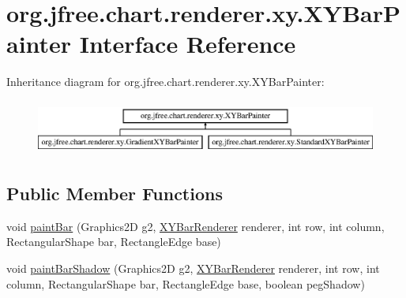 \hypertarget{interfaceorg_1_1jfree_1_1chart_1_1renderer_1_1xy_1_1_x_y_bar_painter}{}\section{org.\+jfree.\+chart.\+renderer.\+xy.\+X\+Y\+Bar\+Painter Interface Reference}
\label{interfaceorg_1_1jfree_1_1chart_1_1renderer_1_1xy_1_1_x_y_bar_painter}
Inheritance diagram for org.\+jfree.\+chart.\+renderer.\+xy.\+X\+Y\+Bar\+Painter\+:\begin{figure}[H]
\begin{center}
\leavevmode
\includegraphics[height=1.830065cm]{interfaceorg_1_1jfree_1_1chart_1_1renderer_1_1xy_1_1_x_y_bar_painter}
\end{center}
\end{figure}
\subsection*{Public Member Functions}
\begin{DoxyCompactItemize}
\item 
void \mbox{\hyperlink{interfaceorg_1_1jfree_1_1chart_1_1renderer_1_1xy_1_1_x_y_bar_painter_a539677e6d12123df18c2ec0c55db5b4b}{paint\+Bar}} (Graphics2D g2, \mbox{\hyperlink{classorg_1_1jfree_1_1chart_1_1renderer_1_1xy_1_1_x_y_bar_renderer}{X\+Y\+Bar\+Renderer}} renderer, int row, int column, Rectangular\+Shape bar, Rectangle\+Edge base)
\item 
void \mbox{\hyperlink{interfaceorg_1_1jfree_1_1chart_1_1renderer_1_1xy_1_1_x_y_bar_painter_a620b61e555580b4968bbcb923f3d4e0e}{paint\+Bar\+Shadow}} (Graphics2D g2, \mbox{\hyperlink{classorg_1_1jfree_1_1chart_1_1renderer_1_1xy_1_1_x_y_bar_renderer}{X\+Y\+Bar\+Renderer}} renderer, int row, int column, Rectangular\+Shape bar, Rectangle\+Edge base, boolean peg\+Shadow)
\end{DoxyCompactItemize}


